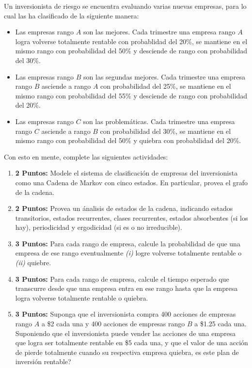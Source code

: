 \documentclass[ a4paper, twoside, 11pt]{article}
\begin{document}
\begin{problem}
Un inversionista de riesgo se encuentra evaluando varias nuevas empresas, para lo cual las ha clasificado de la siguiente manera: 
\begin{itemize}
\item Las empresas rango $A$ son las mejores. Cada trimestre una empresa rango $A$ logra volverse totalmente rentable con probablidad del 20\%, se mantiene en el mismo rango con probabilidad del 50\% y desciende de rango con probabilidad del 30\%. 
\item Las empresas rango $B$ son las segundas mejores. Cada trimestre una empresa rango $B$ \linebreak asciende a rango $A$ con probabilidad del 25\%, se mantiene en el mismo rango con probabilidad del 55\% y desciende de rango con probabilidad del 20\%. 
\item Las empresas rango $C$ son las problem\'aticas. Cada trimestre una empresa rango $C$ asciende a rango $B$ con probabilidad del 30\%, se mantiene en el mismo rango con probabilidad del 50\% y quiebra con probabilidad del 20\%. 
\end{itemize}

Con esto en mente, complete las siguientes actividades: 
\begin{enumerate}[label=\textbf{\alph*)}]
\item \textbf{2 Puntos:} Modele el sistema de clasificaci\'on de empresas del inversionista como una Cadena de Markov con cinco estados. En particular, provea el grafo de la cadena. 
\item \textbf{2 Puntos:} Provea un \'analisis de estados de la cadena, indicando estados transitorios, estados recurrentes, clases recurrentes, estados absorbentes (si los hay), periodicidad y ergodicidad (\ie si es o no irreducible). 
\item \textbf{3 Puntos:} Para cada rango de empresa, calcule la probabilidad de que una empresa de ese rango eventualmente \textit{(i)} logre volverse totalmente rentable o \textit{(ii)} quiebre. 
\item \textbf{3 Puntos:} Para cada rango de empresa, calcule el tiempo esperado que transcurre desde que una empresa entra en ese rango hasta que la empresa logra volverse totalmente rentable o quiebra. 
\item \textbf{3 Puntos:} Suponga que el inversionista compra 400 acciones de empresas rango $A$ a \linebreak \$2 cada una y 400 acciones de empresas rango $B$ a \$1.25 cada una. Suponiendo que el inversionista puede vender las acciones de una empresa que logra ser totalmente rentable en \$5 cada una, y que el valor de una acci\'on de pierde totalmente cuando su respectiva empresa quiebra, es este plan de inversi\'on rentable? 
\end{enumerate}

\end{problem}
\vspace{\baselineskip}
\end{document}
